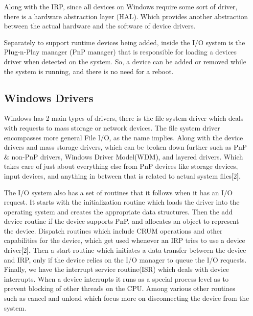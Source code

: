 \documentclass{article}
\begin{document}
    Along with the IRP, since all devices on Windows require some sort of driver, there is a hardware abstraction layer (HAL). Which provides another abstraction between the actual hardware and the software of device drivers.

    Separately to support runtime devices being added, inside the I/O system is the Plug-n-Play manager (PnP manager) that is responsible for loading a devices driver when detected on the system. So, a device can be added or removed while the system is running, and there is no need for a reboot.

\subsection{Windows Drivers}
	Windows has 2 main types of drivers, there is the file system driver which deals with requests to mass storage or network devices. The file system driver encompasses more general File I/O, as the name implies. Along with the device drivers and mass storage drivers, which can be broken down further such as PnP \& non-PnP drivers, Windows Driver Model(WDM), and layered drivers. Which takes care of just about everything else from PnP devices like storage devices, input devices, and anything in between that is related to actual system files[2].

    The I/O system also has a set of routines that it follows when it has an I/O request. It starts with the initialization routine which loads the driver into the operating system and creates the appropriate data structures. Then the add device routine if the device supports PnP, and allocates an object to represent the device. Dispatch routines which include CRUM operations and other capabilities for the device, which get used whenever an IRP tries to use a device driver[2]. Then a start routine which initiates a data transfer between the device and IRP, only if the device relies on the I/O manager to queue the I/O requests. Finally, we have the interrupt service routine(ISR) which deals with device interrupts. When a device interrupts it runs as a special process level as to prevent blocking of other threads on the CPU. Among various other routines such as cancel and unload which focus more on disconnecting the device from the system.
\end{document}
